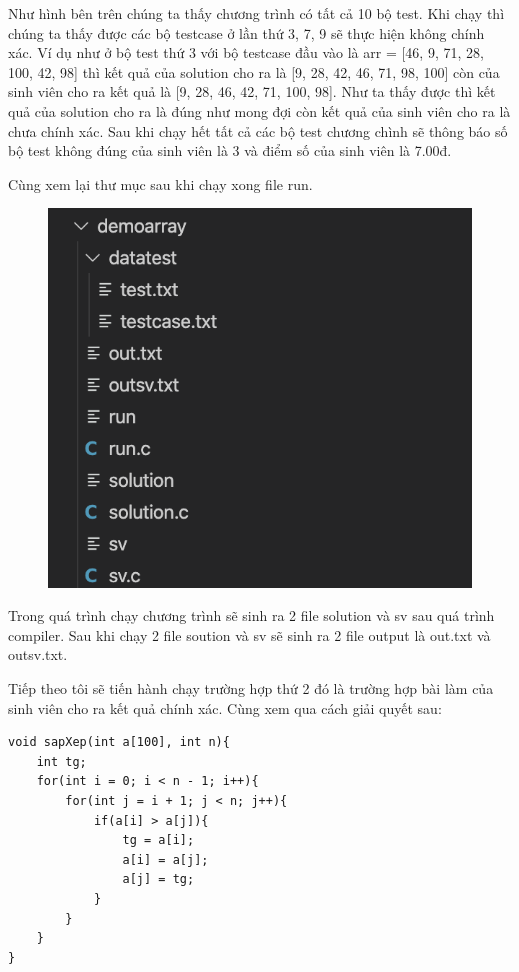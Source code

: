 \documentclass[12pt,a4paper]{article}
\begin{document}
Như hình bên trên chúng ta thấy chương trình có tất cả 10 bộ test. Khi chạy thì chúng ta thấy được các bộ testcase ở lần thứ 3, 7, 9 sẽ thực hiện không chính xác. Ví dụ như ở bộ test thứ 3 với bộ testcase đầu vào là arr = [46, 9, 71, 28, 100, 42, 98] thì kết quả của solution cho ra là [9, 28, 42, 46, 71, 98, 100] còn của sinh viên cho ra kết quả là [9, 28, 46, 42, 71, 100, 98]. Như ta thấy được thì kết quả của solution cho ra là đúng như mong đợi còn kết quả của sinh viên cho ra là chưa chính xác. Sau khi chạy hết tất cả các bộ test chương chình sẽ thông báo số bộ test không đúng của sinh viên là 3 và điểm số của sinh viên là 7.00đ.

Cùng xem lại thư mục sau khi chạy xong file run.

\begin{figure}[ht]
\begin{center}
\includegraphics[scale=.3]{hinhanh/cautrucsauchayrunarray.png}
\end{center}
\end{figure}

Trong quá trình chạy chương trình sẽ sinh ra 2 file solution và sv sau quá trình compiler. Sau khi chạy 2 file soution và sv sẽ sinh ra 2 file output là out.txt và outsv.txt.

Tiếp theo tôi sẽ tiến hành chạy trường hợp thứ 2 đó là trường hợp bài làm của sinh viên cho ra kết quả chính xác. Cùng xem qua cách giải quyết sau:

\begin{lstlisting}
void sapXep(int a[100], int n){
    int tg;
    for(int i = 0; i < n - 1; i++){
        for(int j = i + 1; j < n; j++){
            if(a[i] > a[j]){
                tg = a[i];
                a[i] = a[j];
                a[j] = tg;        
            }
        }
    }
}
\end{lstlisting}
\end{document}
